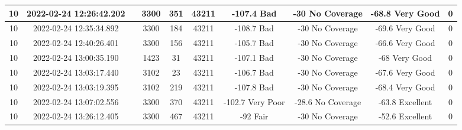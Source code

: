 \begin{longtable*}{|c|c|c|c|c|c|c|c|c|c|}
10&2022-02-24 12:26:42.202&&3300&351&43211& -107.4    Bad         & -30       No Coverage & -68.8     Very Good   & 0\\\hline
{}10&2022-02-24 12:35:34.892&&3300&184&43211& -108.7    Bad         & -30       No Coverage & -69.6     Very Good   & 0\\\hline
{}10&2022-02-24 12:40:26.401&&3300&156&43211& -105.7    Bad         & -30       No Coverage & -66.6     Very Good   & 0\\\hline
{}10&2022-02-24 13:00:35.190&&1423&31&43211& -107.1    Bad         & -30       No Coverage & -68       Very Good   & 0\\\hline
{}10&2022-02-24 13:03:17.440&&3102&23&43211& -106.7    Bad         & -30       No Coverage & -67.6     Very Good   & 0\\\hline
{}10&2022-02-24 13:03:19.395&&3102&219&43211& -107.8    Bad         & -30       No Coverage & -68.4     Very Good   & 0\\\hline
{}10&2022-02-24 13:07:02.556&&3300&370&43211& -102.7    Very Poor   & -28.6     No Coverage & -63.8     Excellent   & 0\\\hline
{}10&2022-02-24 13:26:12.405&&3300&467&43211& -92       Fair        & -30       No Coverage & -52.6     Excellent   & 0\\\hline

\end{longtable*}
